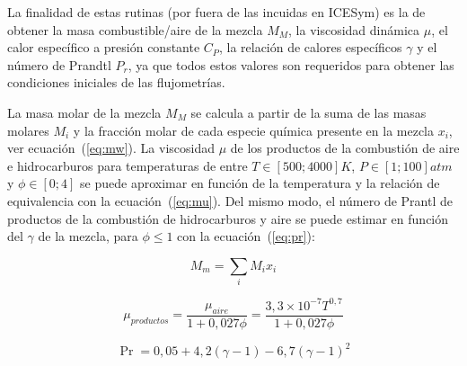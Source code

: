 La finalidad de estas rutinas (por fuera de las incuidas en ICESym) es la de
obtener la masa combustible/aire de la mezcla $M_{M}$, la viscosidad dinámica
$\mu$, el calor específico a presión constante $C_{P}$, la relación de calores
específicos $\gamma$ y el número de Prandtl $P_{r}$, ya que todos estos
valores son requeridos para obtener las condiciones iniciales de las
flujometrías.

La masa molar de la mezcla $M_{M}$ se calcula a partir de la suma de las masas
molares $M_{i}$ y la fracción molar de cada especie química presente en la
mezcla $x_{i}$, ver ecuación~(\ref{eq:mw}).
%
La viscosidad $\mu$ de los productos de la combustión de aire e hidrocarburos
para temperaturas de entre $T\in [500; 4000]K$, $P\in[1; 100]atm$ y
$\phi \in [0;4]$ se puede aproximar en función de la temperatura y la relación
de equivalencia con la ecuación~(\ref{eq:mu}).
%
Del mismo modo, el número de Prantl de productos de la combustión de
hidrocarburos y aire se puede estimar en función del $\gamma$ de la mezcla, para
$\phi\leq 1$ con la ecuación~(\ref{eq:pr})\parencite{heywood}:


\begin{equation}\label{eq:mw}
  M_{m} = \sum_{i} M_{i}x_{i}
\end{equation}

\begin{equation}\label{eq:mu}
  \mu_{productos} = \frac{\mu_{aire}} {1 + 0,027 \phi} = \frac{3,3\times 10^{-7} T^{0,7}} {1 + 0,027 \phi}
\end{equation}

\begin{equation}\label{eq:pr}
    \Pr = 0,05 + 4,2 (\gamma - 1) - 6,7 {(\gamma - 1)}^{2}
\end{equation}
